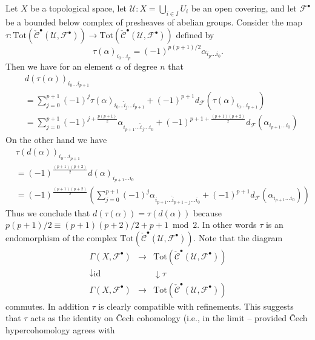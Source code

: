\noindent
Let $X$ be a topological space, let $\mathcal{U} : X = \bigcup_{i \in I} U_i$
be an open covering, and let $\mathcal{F}^\bullet$ be a bounded below
complex of presheaves of abelian groups. Consider the map
$\tau :
\text{Tot}(\check{\mathcal{C}}^\bullet({\mathcal U}, {\mathcal F}^\bullet))
\to
\text{Tot}(\check{\mathcal{C}}^\bullet({\mathcal U}, {\mathcal F}^\bullet))$
defined by
$$
\tau(\alpha)_{i_0 \ldots i_p} = (-1)^{p(p + 1)/2} \alpha_{i_p \ldots i_0}.
$$
Then we have for an element $\alpha$ of degree $n$ that
\begin{align*}
& d(\tau(\alpha))_{i_0 \ldots i_{p + 1}} \\
& =
\sum\nolimits_{j = 0}^{p + 1}
(-1)^j
\tau(\alpha)_{i_0 \ldots \hat i_j \ldots i_{p + 1}}
+
(-1)^{p + 1}
d_{\mathcal F}(\tau(\alpha)_{i_0 \ldots i_{p + 1}})
\\
& =
\sum\nolimits_{j = 0}^{p + 1}
(-1)^{j + \frac{p(p + 1)}{2}}
\alpha_{i_{p + 1} \ldots \hat i_j \ldots i_0}
+
(-1)^{p + 1 + \frac{(p + 1)(p + 2)}{2}}
d_{\mathcal F}(\alpha_{i_{p + 1} \ldots i_0})
\end{align*}
On the other hand we have
\begin{align*}
&\tau(d(\alpha))_{i_0\ldots i_{p + 1}} \\
& =
(-1)^{\frac{(p + 1)(p + 2)}{2}} d(\alpha)_{i_{p + 1} \ldots i_0}
\\
& =
(-1)^{\frac{(p + 1)(p + 2)}{2}}
\left(
\sum\nolimits_{j = 0}^{p + 1}
(-1)^j
\alpha_{i_{p + 1}\ldots \hat i_{p + 1 - j} \ldots i_0}
+
(-1)^{p + 1}
d_{\mathcal F}(\alpha_{i_{p + 1}\ldots i_0})
\right)
\end{align*}
Thus we conclude that $d(\tau(\alpha)) = \tau(d(\alpha))$
because $p(p + 1)/2 \equiv (p + 1)(p + 2)/2 + p + 1 \bmod 2$. In other words
$\tau$ is an endomorphism of the complex
$\text{Tot}(\check{\mathcal{C}}^\bullet({\mathcal U}, {\mathcal F}^\bullet))$.
Note that the diagram
$$
\begin{matrix}
\Gamma(X, {\mathcal F}^\bullet) &
\longrightarrow &
\text{Tot}(\check{\mathcal{C}}^\bullet({\mathcal U}, {\mathcal F}^\bullet)) \\
\downarrow \text{id} & & \downarrow \tau \\
\Gamma(X, {\mathcal F}^\bullet) &
\longrightarrow &
\text{Tot}(\check{\mathcal{C}}^\bullet({\mathcal U}, {\mathcal F}^\bullet))
\end{matrix}
$$
commutes. In addition $\tau$ is clearly compatible with refinements.
This suggests that $\tau$ acts as the identity on {\v C}ech cohomology
(i.e., in the limit -- provided {\v C}ech hypercohomology agrees with
